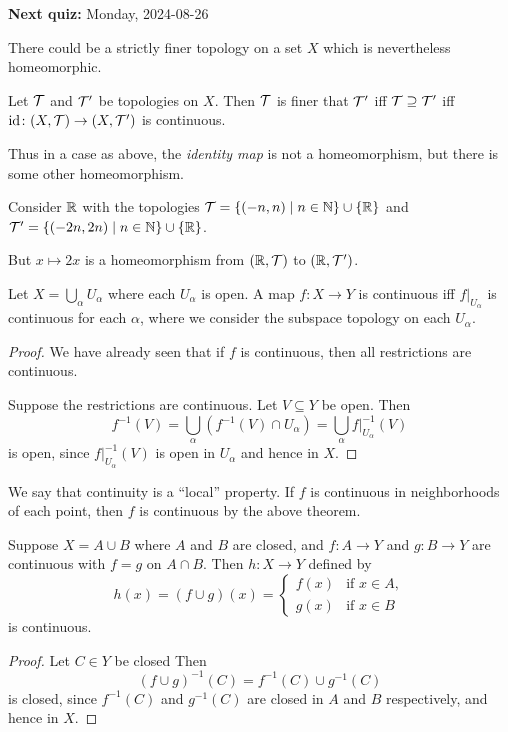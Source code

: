 \textbf{Next quiz:} Monday, 2024-08-26

\begin{remark}[A subtlety]
    There could be a strictly finer topology on a set $X$ which is
    nevertheless homeomorphic.

    Let $\mathcal{T}$ and $\mathcal{T}'$ be topologies on $X$.
    Then $\mathcal{T}$ is finer that $\mathcal{T}'$ iff $\mathcal{T} \supseteq \mathcal{T}'$ iff
    $\operatorname{id}\colon (X, \mathcal{T}) \to (X, \mathcal{T}')$ is continuous.

    Thus in a case as above, the \emph{identity map} is not a homeomorphism,
    but there is some other homeomorphism.
\end{remark}
\begin{example}
    Consider $\mathbb{R}$ with the topologies
    $\mathcal{T} = \{(-n, n) \mid n \in \mathbb{N}\} \cup \{\mathbb{R}\}$ and
    $\mathcal{T}' = \{(-2n, 2n) \mid n \in \mathbb{N}\} \cup \{\mathbb{R}\}$.

    But $x \mapsto 2x$ is a homeomorphism from
    $(\mathbb{R}, \mathcal{T})$ to $(\mathbb{R}, \mathcal{T}')$.
\end{example}

\begin{theorem}
    Let $X = \bigcup_\alpha U_\alpha$
    where each $U_\alpha$ is open.
    A map $f\colon X \to Y$ is continuous iff $f\vert_{U_\alpha}$
    is continuous for each $\alpha$,
    where we consider the subspace topology on each $U_\alpha$.
\end{theorem}
\begin{proof}
    We have already seen that if $f$ is continuous, then
    all restrictions are continuous.

    Suppose the restrictions are continuous.
    Let $V \subseteq Y$ be open.
    Then \[
        f^{-1}(V) = \bigcup_\alpha (f^{-1}(V) \cap U_\alpha)
            = \bigcup_\alpha f\vert_{U_\alpha}^{-1}(V)
    \] is open, since $f\vert_{U_\alpha}^{-1}(V)$ is open in $U_\alpha$
    and hence in $X$.
\end{proof}

We say that continuity is a ``local'' property.
If $f$ is continuous in neighborhoods of each point,
then $f$ is continuous by the above theorem.

\begin{theorem} \label{thm:pasting-lemma}
    Suppose $X = A \cup B$ where $A$ and $B$ are closed,
    and $f\colon A \to Y$ and $g\colon B \to Y$ are continuous
    with $f = g$ on $A \cap B$.
    Then $h\colon X \to Y$ defined by \[
        h(x) = (f \cup g)(x) = \begin{cases}
            f(x) & \text{if } x \in A, \\
            g(x) & \text{if } x \in B
        \end{cases}
    \] is continuous.
\end{theorem}
\begin{proof}
    Let $C \in Y$ be closed
    Then \[
        (f \cup g)^{-1}(C) = f^{-1}(C) \cup g^{-1}(C)
    \] is closed, since $f^{-1}(C)$ and $g^{-1}(C)$ are closed
    in $A$ and $B$ respectively, and hence in $X$.
\end{proof}

